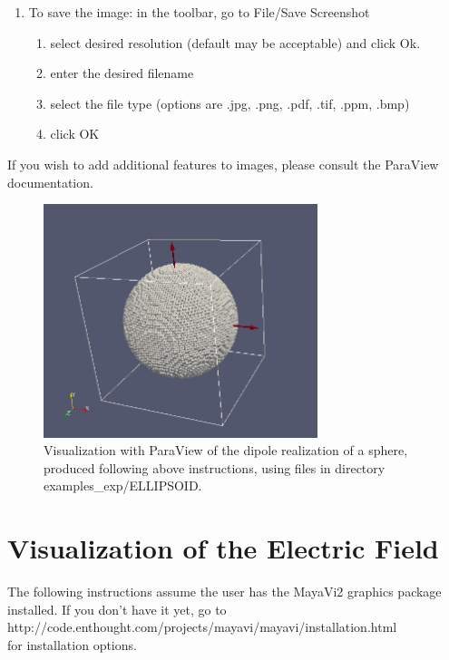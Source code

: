 \begin{enumerate}
\item To save the image: in the toolbar, go to File/Save Screenshot
\begin{enumerate}
\item select desired resolution (default may be acceptable) and click \textquotedbl{}Ok\textquotedbl{}.
\item enter the desired filename
\item select the file type 
(options are .jpg, .png, .pdf, .tif, .ppm, .bmp)
\item click \textquotedbl{}OK\textquotedbl{}
\end{enumerate}
\end{enumerate}


\noindent If you wish to add additional features to images,
please consult the ParaView documentation.

\begin{figure}[h]
\begin{center}
\includegraphics[width=8.0cm,angle=0]{ELLIPSOID.jpg}
\caption{\footnotesize
         Visualization with ParaView of the dipole realization of a sphere,
         produced following above instructions, using files in directory
examples\_exp/ELLIPSOID.}
\end{center}
\end{figure} 

\section{Visualization of the Electric Field
         \label{sec:visualization of E}
         }

The following instructions assume the user has the MayaVi2 graphics package installed.
If you don't have it yet, go to\\
\indent\indent http://code.enthought.com/projects/mayavi/mayavi/installation.html\\
for installation options.

